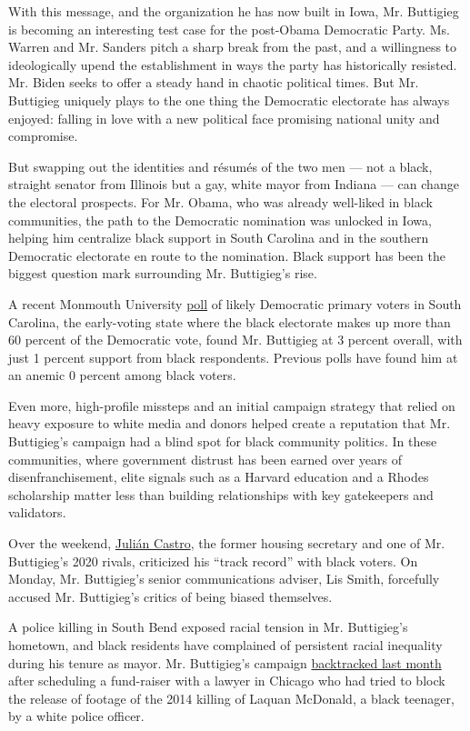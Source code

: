 With this message, and the organization he has now built in Iowa, Mr.
Buttigieg is becoming an interesting test case for the post-Obama
Democratic Party. Ms. Warren and Mr. Sanders pitch a sharp break from
the past, and a willingness to ideologically upend the establishment in
ways the party has historically resisted. Mr. Biden seeks to offer a
steady hand in chaotic political times. But Mr. Buttigieg uniquely plays
to the one thing the Democratic electorate has always enjoyed: falling
in love with a new political face promising national unity and
compromise.

But swapping out the identities and résumés of the two men --- not a
black, straight senator from Illinois but a gay, white mayor from
Indiana --- can change the electoral prospects. For Mr. Obama, who was
already well-liked in black communities, the path to the Democratic
nomination was unlocked in Iowa, helping him centralize black support in
South Carolina and in the southern Democratic electorate en route to the
nomination. Black support has been the biggest question mark surrounding
Mr. Buttigieg's rise.

A recent Monmouth University
\href{https://www.monmouth.edu/polling-institute/reports/monmouthpoll_sc_102319/}{poll}
of likely Democratic primary voters in South Carolina, the early-voting
state where the black electorate makes up more than 60 percent of the
Democratic vote, found Mr. Buttigieg at 3 percent overall, with just 1
percent support from black respondents. Previous polls have found him at
an anemic 0 percent among black voters.

Even more, high-profile missteps and an initial campaign strategy that
relied on heavy exposure to white media and donors helped create a
reputation that Mr. Buttigieg's campaign had a blind spot for black
community politics. In these communities, where government distrust has
been earned over years of disenfranchisement, elite signals such as a
Harvard education and a Rhodes scholarship matter less than building
relationships with key gatekeepers and validators.

Over the weekend,
\href{https://www.nytimes3xbfgragh.onion/interactive/2020/us/elections/julian-castro.html}{Julián
Castro}, the former housing secretary and one of Mr. Buttigieg's 2020
rivals, criticized his ``track record'' with black voters. On Monday,
Mr. Buttigieg's senior communications adviser, Lis Smith, forcefully
accused Mr. Buttigieg's critics of being biased themselves.

A police killing in South Bend exposed racial tension in Mr. Buttigieg's
hometown, and black residents have complained of persistent racial
inequality during his tenure as mayor. Mr. Buttigieg's campaign
\href{https://www.nytimes3xbfgragh.onion/2019/10/18/us/politics/buttigieg-laquan-mcdonald-lawyer.html}{backtracked
last month} after scheduling a fund-raiser with a lawyer in Chicago who
had tried to block the release of footage of the 2014 killing of Laquan
McDonald, a black teenager, by a white police officer.

